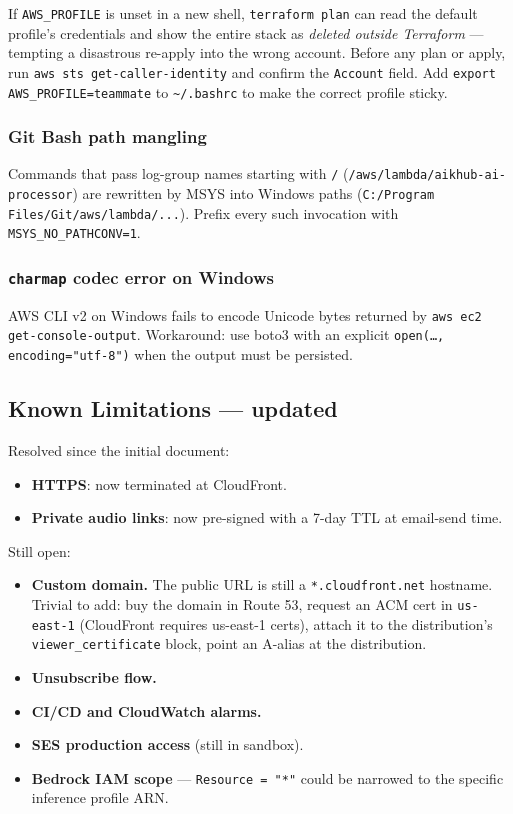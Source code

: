 \documentclass[11pt,a4paper]{article}
\begin{document}
If \texttt{AWS\_PROFILE} is unset in a new shell, \texttt{terraform plan}
can read the default profile's credentials and show the entire stack as
\emph{deleted outside Terraform} --- tempting a disastrous re-apply into
the wrong account. Before any plan or apply, run
\texttt{aws sts get-caller-identity} and confirm the \texttt{Account}
field. Add \texttt{export AWS\_PROFILE=teammate} to
\texttt{\textasciitilde/.bashrc} to make the correct profile sticky.

\subsubsection*{Git Bash path mangling}

Commands that pass log-group names starting with \texttt{/}
(\texttt{/aws/lambda/aikhub-ai-processor}) are rewritten by MSYS into
Windows paths (\texttt{C:/Program Files/Git/aws/lambda/...}). Prefix
every such invocation with \texttt{MSYS\_NO\_PATHCONV=1}.

\subsubsection*{\texttt{charmap} codec error on Windows}

AWS CLI v2 on Windows fails to encode Unicode bytes returned by
\texttt{aws ec2 get-console-output}. Workaround: use boto3 with an
explicit \texttt{open(\ldots, encoding="utf-8")} when the output must
be persisted.

\subsection{Known Limitations --- updated}

Resolved since the initial document:
\begin{itemize}[leftmargin=*]
  \item \textbf{HTTPS}: now terminated at CloudFront.
  \item \textbf{Private audio links}: now pre-signed with a 7-day TTL at
        email-send time.
\end{itemize}

Still open:
\begin{itemize}[leftmargin=*]
  \item \textbf{Custom domain.} The public URL is still a
        \texttt{*.cloudfront.net} hostname. Trivial to add: buy the
        domain in Route 53, request an ACM cert in
        \texttt{us-east-1} (CloudFront requires us-east-1 certs), attach
        it to the distribution's \texttt{viewer\_certificate} block,
        point an A-alias at the distribution.
  \item \textbf{Unsubscribe flow.}
  \item \textbf{CI/CD and CloudWatch alarms.}
  \item \textbf{SES production access} (still in sandbox).
  \item \textbf{Bedrock IAM scope} --- \texttt{Resource = "*"} could be
        narrowed to the specific inference profile ARN.
\end{itemize}
\end{document}
